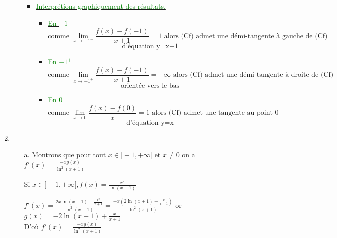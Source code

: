 \documentclass[12pt]{article}
\begin{document}
\begin{enumerate}
\begin{enumerate}
\begin{itemize}
\item \underline{\textcolor{green}{Interprétions graphiquement des résultats.}}

\begin{itemize}
\item \underline{\textcolor{green}{En $-1^{-}$}}
\[\text{comme } \lim_{x \to -1^{-}} \frac{f(x)-f(-1)}{x+1}=1 \text{ alors (Cf) admet une démi-tangente à gauche de (Cf)} \]
\[\text{d'équation y=x+1} \]
\item \underline{\textcolor{green}{En $-1^{+}$}}
\[\text{comme } \lim_{x \to -1^{+}} \frac{f(x)-f(-1)}{x+1}=+\infty \text{ alors (Cf) admet une démi-tangente à droite de (Cf)} \]
\[\text{orientée vers le bas} \]
\item \underline{\textcolor{green}{En $0$}}
\[\text{comme } \lim_{x \to 0} \frac{f(x)-f(0)}{x}=1 \text{ alors (Cf) admet une tangente au point 0 } \]
\[\text{d'équation y=x} \]
\end{itemize}

\end{itemize}
\end{enumerate}
\item
\begin{enumerate}
\item[a.] Montrons que pour tout $x \in ]-1, +\infty[$ et $x\neq 0$ on a $f'(x)=\frac{-xg(x)}{\ln^{2}(x+1)}$

Si $x \in ]-1, +\infty[, f(x)=\frac{x^{2}}{\ln(x+1)}$

$f'(x)=\frac{2x\ln(x+1)-\frac{x^{2}}{x+1}}{\ln^{2}(x+1)}=\frac{-x\left( 2\ln(x+1)-\frac{x}{x+1}\right) }{\ln^{2}(x+1)}$ or $g(x)=-2\ln(x+1)+\frac{x}{x+1}$\\
D'où $f'(x)=\frac{-xg(x)}{\ln^{2}(x+1)}$
\end{enumerate}
\end{enumerate}
\end{document}
